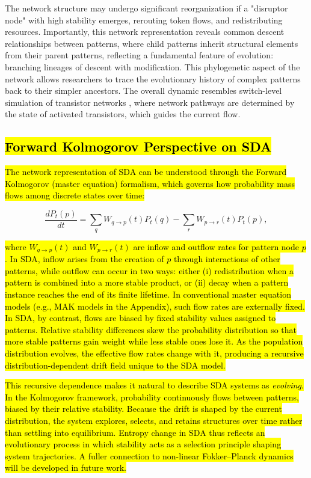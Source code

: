 \documentclass[preprint,12pt]{elsarticle}
\newcommand{\added}[1]{\hl{#1}}
\begin{document}
The network structure may undergo significant reorganization if a "disruptor node" with high stability emerges, rerouting token flows, and redistributing resources. Importantly, this network representation reveals common descent relationships between patterns, where child patterns inherit structural elements from their parent patterns, reflecting a fundamental feature of evolution: branching lineages of descent with modification. This phylogenetic aspect of the network allows researchers to trace the evolutionary history of complex patterns back to their simpler ancestors. The overall dynamic resembles switch-level simulation of transistor networks \cite{AdlerCAD}, where network pathways are determined by the state of activated transistors, which guides the current flow.

\subsection{\added{Forward Kolmogorov Perspective on SDA}}

\added{The network representation of SDA can be understood through the Forward Kolmogorov (master equation) formalism, which governs how probability mass flows among discrete states over time:}

\begin{equation}
\label{eq:kolmogorov-general}
\frac{dP_t(p)}{dt}
= \sum_{q} W_{q \to p}(t) P_t(q)
- \sum_{r} W_{p \to r}(t) P_t(p),
\end{equation}

\added{where $W_{q \to p}(t)$ and $W_{p \to r}(t)$ are inflow and outflow rates for pattern node $p$. In SDA, inflow arises from the creation of $p$ through interactions of other patterns, while outflow can occur in two ways: either (i) redistribution when a pattern is combined into a more stable product, or (ii) decay when a pattern instance reaches the end of its finite lifetime. In conventional master equation models (e.g., MAK models in the Appendix), such flow rates are externally fixed. In SDA, by contrast, flows are biased by fixed stability values assigned to patterns. Relative stability differences skew the probability distribution so that more stable patterns gain weight while less stable ones lose it. As the population distribution evolves, the effective flow rates change with it, producing a recursive distribution-dependent drift field unique to the SDA model.}


\added{This recursive dependence makes it natural to describe SDA systems as \emph{evolving}. In the Kolmogorov framework, probability continuously flows between patterns, biased by their relative stability. Because the drift is shaped by the current distribution, the system explores, selects, and retains structures over time rather than settling into equilibrium. Entropy change in SDA thus reflects an evolutionary process in which stability acts as a selection principle shaping system trajectories. A fuller connection to non-linear Fokker–Planck dynamics will be developed in future work.}
\end{document}
